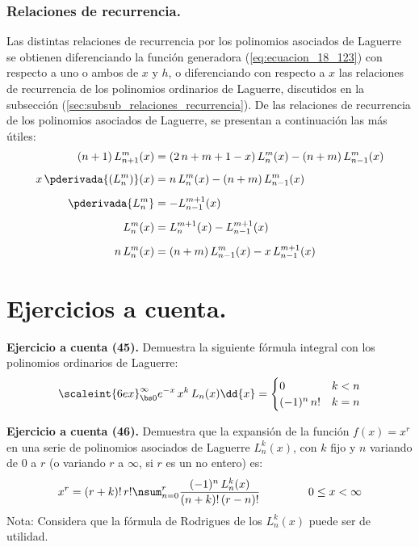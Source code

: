 \subsubsection{Relaciones de recurrencia.}

Las distintas relaciones de recurrencia por los polinomios asociados de Laguerre se obtienen diferenciando la función generadora (\ref{eq:ecuacion_18_123}) con respecto a uno o ambos de $x$ y $h$, o diferenciando con respecto a $x$ las relaciones de recurrencia de los polinomios ordinarios de Laguerre, discutidos en la subsección (\ref{sec:subsub_relaciones_recurrencia}). De las relaciones de recurrencia de los polinomios asociados de Laguerre, se presentan a continuación las más útiles:
\begin{align}
(n + 1) \, L_{n+1}^{m} (x) &= (2 \, n + m + 1 - x) \, L_{n}^{m} (x) - (n + m) \, L_{n-1}^{m} (x) \label{eq:ecuacion_18_124} \\[0.5em]
x \, \pderivada{(L_{n}^{m})} (x) &= n \, L_{n}^{m} (x) - (n + m) \, L_{n-1}^{m} (x) \label{eq:ecuacion_18_125} \\[0.5em]
\pderivada{L_{n}^{m}} &= - L_{n-1}^{m+1} (x) \label{eq:ecuacion_18_125a} \\[0.5em]
L_{n}^{m} (x) &= L_{n}^{m+1} (x) - L_{n-1}^{m+1} (x) \label{eq:ecuacion_18_125b} \\[0.5em]
n \, L_{n}^{m} (x) &= (n + m) \, L_{n-1}^{m} (x) - x \, L_{n-1}^{m+1} (x) \label{eq:ecuacion_18_125c}
\end{align}

\newpage
\section{Ejercicios a cuenta.}

\noindent
\textbf{Ejercicio a cuenta (45).} Demuestra la siguiente fórmula integral con los polinomios ordinarios de Laguerre:
\begin{align*}
\scaleint{6ex}_{\bs 0}^{\infty} e^{-x} \, x^{k} \, L_{n}(x) \dd{x} = \begin{cases}
0 & k < n \\
(-1)^{n} \, n! & k = n
\end{cases}
\end{align*}


\noindent
\textbf{Ejercicio a cuenta (46).} Demuestra que la expansión de la función \break \hfill $f(x) =x^{r}$ en una serie de polinomios asociados de Laguerre $L_{n}^{k}(x)$, con $k$ fijo y $n$ variando de $0$ a $r$ (o variando $r$ a $\infty$, si $r$ es un no entero) es:
\begin{align*}
x^{r} = (r + k)! \, r! \nsum_{n=0}^{r} \dfrac{(-1)^{n} \, L_{n}^{k}(x)}{(n + k)! \, (r - n)!} \hspace{1.5cm} 0 \leq x < \infty
\end{align*}
Nota: Considera que la fórmula de Rodrigues de los $L_{n}^{k}(x)$ puede ser de utilidad.


